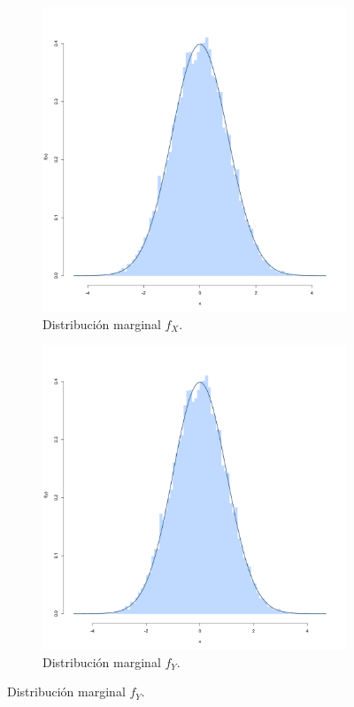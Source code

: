 \documentclass[11pt,a4paper]{article}
\begin{document}
\begin{figure}[!p]
    \centering
    \begin{subfigure}[t]{0.45\textwidth}
        \centering
        \includegraphics[width=\linewidth]{x_norm.png} 
        \caption{Distribución marginal $f_X$.} \label{fig:xnorm}
    \end{subfigure}
    \hfill
    \begin{subfigure}[t]{0.45\textwidth}
        \centering
        \includegraphics[width=\linewidth]{y_norm.png} 
        \caption{Distribución marginal $f_Y$.} \label{fig:ynorm}
    \end{subfigure}


\end{figure}
\end{document}
